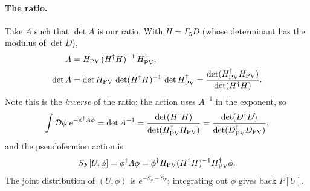\documentclass[11pt,a4paper]{article}
\numberwithin{equation}{section}
\newcommand{\dg}{^{\dagger}}
\newcommand{\Dpv}{D_{\mathrm{PV}}}
\newcommand{\Gfive}{\Gamma_5}
\begin{document}
\paragraph{The ratio.} Take $A$ such that $\det A$ is our ratio. With $H=\Gfive D$ (whose
determinant has the modulus of $\det D$),
\begin{align}
A&=H_{\rm PV}\,(H\dg H)^{-1}\,H_{\rm PV}\dg,\nonumber\\
\det A&=\det H_{\rm PV}\,\det(H\dg H)^{-1}\,\det H_{\rm PV}\dg
=\frac{\det(H_{\rm PV}\dg H_{\rm PV})}{\det(H\dg H)}.
\end{align}
Note this is the \emph{inverse} of the ratio; the action uses $A^{-1}$ in the exponent, so
\begin{equation}
\int\mathcal D\phi\;e^{-\phi\dg A\phi}=\det A^{-1}=\frac{\det(H\dg H)}{\det(H_{\rm PV}\dg H_{\rm PV})}
=\frac{\det(D\dg D)}{\det(\Dpv\dg\Dpv)},
\end{equation}
and the pseudofermion action is
\begin{equation}
S_F[U,\phi]=\phi\dg A\phi=\phi\dg H_{\rm PV}(H\dg H)^{-1}H_{\rm PV}\dg\phi .
\end{equation}
The joint distribution of $(U,\phi)$ is $e^{-S_g-S_F}$; integrating out $\phi$ gives back $P[U]$.
\end{document}
